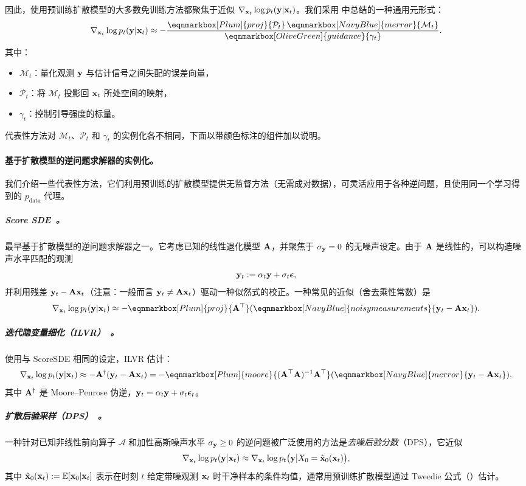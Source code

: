 因此，使用预训练扩散模型的大多数免训练方法都聚焦于近似 $\nabla_{{\mathbf{x}}_t} \log p_t({\mathbf{y}} | {\mathbf{x}}_t)$。我们采用 \citep{daras2024survey} 中总结的一种通用元形式：
\begin{equation*}
    \nabla_{\rvx_t} \log p_t(\rvy | \rvx_t) \approx - \frac{\eqnmarkbox[Plum]{proj}{\mathcal{P}_t}  \, \eqnmarkbox[NavyBlue]{merror}{    \mathcal{M}_t    }}{\eqnmarkbox[OliveGreen]{guidance}{  \gamma_t  }}.
\end{equation*}
其中：
\begin{itemize}
    \item $\mathcal{M}_t$：量化观测 ${\mathbf{y}}$ 与估计信号之间失配的误差向量，
    \item $\mathcal{P}_t$：将 $\mathcal{M}_t$ 投影回 ${\mathbf{x}}_t$ 所处空间的映射，
    \item $\gamma_t$：控制引导强度的标量。
\end{itemize}

代表性方法对 $\mathcal{M}_t$、$\mathcal{P}_t$ 和 $\gamma_t$ 的实例化各不相同，下面以带颜色标注的组件加以说明。

\paragraph{基于扩散模型的逆问题求解器的实例化。}
我们介绍一些代表性方法，它们利用预训练的扩散模型提供无监督方法（无需成对数据），可灵活应用于各种逆问题，且使用同一个学习得到的 $ p_{\mathrm{data}} $ 代理。


\subparagraph{Score SDE~\citep{song2020score}。} 最早基于扩散模型的逆问题求解器之一。它考虑已知的线性退化模型 ${\mathbf{A}}$，并聚焦于 $\sigma_{{\mathbf{y}}} = 0$ 的无噪声设定。由于 ${\mathbf{A}}$ 是线性的，可以构造噪声水平匹配的观测
\[
{\mathbf{y}}_t := \alpha_t {\mathbf{y}} + \sigma_t \bm{\epsilon},
\]
并利用残差 ${\mathbf{y}}_t - {\mathbf{A}} {\mathbf{x}}_t$（注意：一般而言 ${\mathbf{y}}_t \neq {\mathbf{A}}{\mathbf{x}}_t$）驱动一种似然式的校正。一种常见的近似（舍去乘性常数）是
\begin{align*}
    \nabla_{\rvx_t} \log p_t(\rvy|\rvx_t) \approx - \eqnmarkbox[Plum]{proj}{\rmA^\top} (\eqnmarkbox[NavyBlue]{noisymeasurements}{\rvy_t - \rmA \rvx_t}).
\end{align*}

\subparagraph{迭代隐变量细化（ILVR）~\citep{choi2021ilvr}。} 使用与 ScoreSDE 相同的设定，ILVR 估计：
\begin{align*}
    \nabla_{\rvx_t} \log p_t(\rvy| \rvx_t) \approx -\rmA^\dagger(\rvy_t - \rmA\rvx_t) = -\eqnmarkbox[Plum]{moore}{(\rmA^\top \rmA)^{-1} \rmA^\top} (\eqnmarkbox[NavyBlue]{merror}{\rvy_t - \rmA\rvx_t}),
\end{align*}
其中 ${\mathbf{A}}^\dagger$ 是 Moore–Penrose 伪逆，${\mathbf{y}}_t = \alpha_t{\mathbf{y}} + \sigma_t \bm{\epsilon}_t$。
\subparagraph{扩散后验采样（DPS）~\citep{chung2022diffusion}。} 一种针对已知非线性前向算子 $\mathcal{A}$ 和加性高斯噪声水平 $\sigma_{{\mathbf{y}}} \ge 0$ 的逆问题被广泛使用的方法是\emph{去噪后验分数}（DPS），它近似
\begin{align}\label{eq:dps-score}
  \nabla_{{\mathbf{x}}_t} \log p_t({\mathbf{y}}|{\mathbf{x}}_t)
   \approx
  \nabla_{{\mathbf{x}}_t} \log p_t\bigl({\mathbf{y}}|X_0 = \hat{{\mathbf{x}}}_0({\mathbf{x}}_t)\bigr),
\end{align}
其中 $\hat{{\mathbf{x}}}_0({\mathbf{x}}_t) := \mathbb{E}[{\mathbf{x}}_0|{\mathbf{x}}_t]$ 表示在时刻 $t$ 给定带噪观测 ${\mathbf{x}}_t$ 时干净样本的条件均值，通常用预训练扩散模型通过 Tweedie 公式（）估计。

